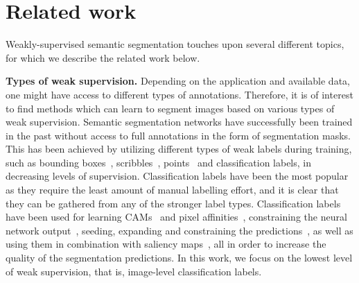 \documentclass{article}
\begin{document}
\section{Related work}

Weakly-supervised semantic segmentation touches upon several different topics, for which we describe the related work below.

\textbf{Types of weak supervision.} Depending on the application and available data, one might have access to different types of annotations. Therefore, it is of interest to find methods which can learn to segment images based on various types of weak supervision. Semantic segmentation networks have successfully been trained in the past without access to full annotations in the form of segmentation masks. This has been achieved by utilizing different types of weak labels during training, such as bounding boxes~\cite{dai2015iccv, khoreva2017cvpr, papandreou2015iccv}, scribbles~\cite{lin2016cvpr, vernaza2017cvpr}, points~\cite{bearman2016eccv} and classification labels, in decreasing levels of supervision. Classification labels have been the most popular as they require the least amount of manual labelling effort, and it is clear that they can be gathered from any of the stronger label types. Classification labels have been used for learning CAMs~\cite{wang2020cvpr, lee2019cvpr} and pixel affinities~\cite{ahn2018cvpr}, constraining the neural network output~\cite{pathak2015iccv}, seeding, expanding and constraining the predictions~\cite{kolesnikov2016eccv}, as well as using them in combination with saliency maps~\cite{wei2016tpami}, all in order to increase the quality of the segmentation predictions. In this work, we focus on the lowest level of weak supervision, that is, image-level classification labels.
\end{document}
